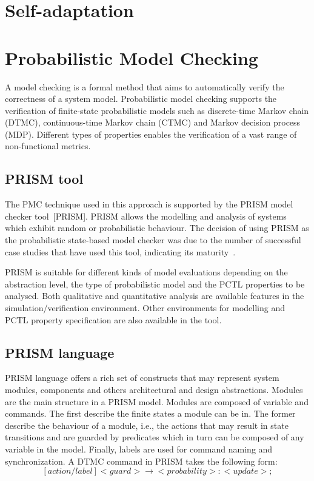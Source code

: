 \section{Self-adaptation}

\section{Probabilistic Model Checking}

A model checking is a formal method that aims to automatically verify the correctness of a system model. Probabilistic model checking supports the verification of finite-state probabilistic models such as discrete-time Markov chain (DTMC), continuous-time Markov chain (CTMC) and Markov decision process (MDP). Different types of properties enables the verification of a vast range of non-functional metrics.

\subsection{PRISM tool}

The PMC technique used in this approach is supported by the PRISM model checker tool~[PRISM]. PRISM allows the modelling and analysis of systems which exhibit random or probabilistic behaviour. The decision of using PRISM as the probabilistic state-based model checker was due to the number of successful case studies that have used this tool, indicating its maturity~\cite{PRISM:pubs}.


PRISM is suitable for different kinds of model evaluations depending on the abstraction level, the type of probabilistic model and the PCTL properties to be analysed. Both qualitative and quantitative analysis are available features in the simulation/verification environment. Other environments for modelling and PCTL property specification are also available in the tool.
  
\subsection{PRISM language}

PRISM language offers a rich set of constructs that may represent system modules, components and others architectural and design abstractions. Modules are the main structure in a PRISM model. Modules are composed of variable and commands. The first describe the finite states a module can be in. The former describe the behaviour of a module, i.e., the actions that may result in state transitions and are guarded by predicates which in turn can be composed of any variable in the model. Finally, labels are used for command naming and synchronization. A DTMC command in PRISM takes the following form: $$[action/label]<guard>\to<probability>:<update>;$$

